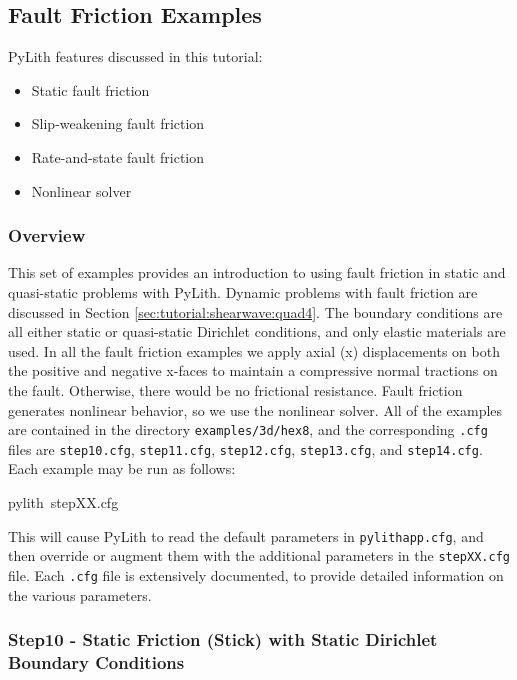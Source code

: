 
\subsection{\label{sec:Tutorial-3d-hex8-friction}Fault Friction Examples}

PyLith features discussed in this tutorial:
\begin{itemize}
\item Static fault friction
\item Slip-weakening fault friction
\item Rate-and-state fault friction
\item Nonlinear solver
\end{itemize}

\subsubsection{Overview}

This set of examples provides an introduction to using fault friction
in static and quasi-static problems with PyLith. Dynamic problems
with fault friction are discussed in Section \ref{sec:tutorial:shearwave:quad4}.
The boundary conditions are all either static or quasi-static Dirichlet
conditions, and only elastic materials are used. In all the fault
friction examples we apply axial (x) displacements on both the positive
and negative x-faces to maintain a compressive normal tractions on
the fault. Otherwise, there would be no frictional resistance. Fault
friction generates nonlinear behavior, so we use the nonlinear solver.
All of the examples are contained in the directory \texttt{examples/3d/hex8},
and the corresponding \texttt{.cfg} files are \texttt{step10.cfg},
\texttt{step11.cfg}, \texttt{step12.cfg}, \texttt{step13.cfg}, and
\texttt{step14.cfg}. Each example may be run as follows:
\begin{lyxcode}
pylith~stepXX.cfg
\end{lyxcode}
This will cause PyLith to read the default parameters in \texttt{pylithapp.cfg},
and then override or augment them with the additional parameters in
the \texttt{stepXX.cfg} file. Each \texttt{.cfg} file is extensively
documented, to provide detailed information on the various parameters.


\subsubsection{Step10 - Static Friction (Stick) with Static Dirichlet Boundary Conditions}

